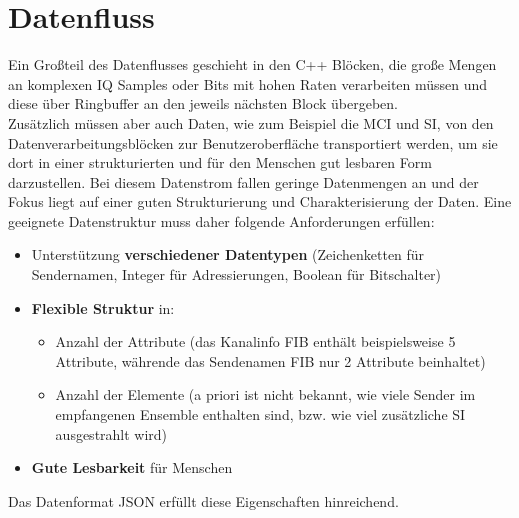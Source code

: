 \section{Datenfluss}
Ein Großteil des Datenflusses geschieht in den C++ Blöcken, die große Mengen an komplexen IQ Samples oder Bits mit hohen Raten verarbeiten müssen und diese über Ringbuffer an den jeweils nächsten Block übergeben. \\
Zusätzlich müssen aber auch Daten, wie zum Beispiel die MCI und SI, von den Datenverarbeitungsblöcken zur Benutzeroberfläche transportiert werden, um sie dort in einer strukturierten und für den Menschen gut lesbaren Form darzustellen. Bei diesem Datenstrom fallen geringe Datenmengen an und der Fokus liegt auf einer guten Strukturierung und Charakterisierung der Daten.
Eine geeignete Datenstruktur muss daher folgende Anforderungen erfüllen:
\begin{itemize}
\item Unterstützung \textbf{verschiedener Datentypen} (Zeichenketten für Sendernamen, Integer für Adressierungen, Boolean für Bitschalter)
\item \textbf{Flexible Struktur} in:
\begin{itemize}
\item Anzahl der Attribute (das Kanalinfo FIB enthält beispielsweise 5 Attribute, währende das Sendenamen FIB nur 2 Attribute beinhaltet)
\item Anzahl der Elemente (a priori ist nicht bekannt, wie viele Sender im empfangenen Ensemble enthalten sind, bzw. wie viel zusätzliche SI ausgestrahlt wird)
\end{itemize}
\item \textbf{Gute Lesbarkeit} für Menschen
\end{itemize}
Das Datenformat \ac{JSON} erfüllt diese Eigenschaften hinreichend.
